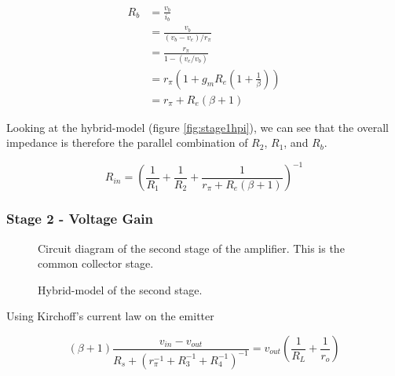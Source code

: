 \documentclass[a4paper,11pt]{article}
\begin{document}
            \begin{subequations}
            \begin{align}
                R_b &= \frac{v_b}{i_b}\\
                    &= \frac{v_b}{(v_b - v_e) / r_{\pi}}\\
                    &= \frac{r_{\pi}}{1 - (v_e / v_b)}\\
                    &= r_{\pi} \left( 1 + g_m R_e \left( 1 + \frac{1}{\beta} \right) \right)\\
                    &= r_{\pi} + R_e (\beta + 1)
            \end{align}
            \end{subequations}
            
            Looking at the hybrid-\textpi model (figure \ref{fig:stage1hpi}), we can see that the overall impedance is therefore the parallel combination of $R_2$, $R_1$, and $R_b$.
            
            \begin{equation}
                R_{in} = \left( \frac{1}{R_1} + \frac{1}{R_2} + \frac{1}{r_{\pi} + R_e (\beta + 1)} \right) ^{-1}
            \end{equation}
            
        \newpage
        \subsubsection{Stage 2 - Voltage Gain}
            \begin{figure}[h]
            \centering
                
                \caption{Circuit diagram of the second stage of the amplifier. This is the common collector stage.}
                \label{fig:stage2}
            \end{figure}
            
            \begin{figure}[h]
            \centering
                
                \caption{Hybrid-\textpi model of the second stage.}
                \label{fig:stage2hpi}
            \end{figure}
            
            Using Kirchoff's current law on the emitter
            
            \begin{equation}
                (\beta + 1) \frac{v_{in} - v_{out}}{R_s + \left( r_{\pi}^{-1} + R_{3}^{-1} + R_{4}^{-1} \right)^{-1}} = v_{out} \left( \frac{1}{R_L} + \frac{1}{r_o} \right)
            \end{equation}
            
\end{document}
